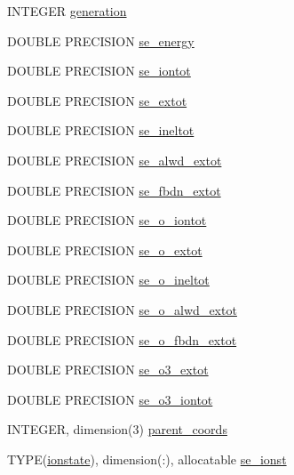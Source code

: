 \begin{DoxyCompactItemize}
\item 
INTEGER \hyperlink{typetypedefs_1_1se__info_aa87601b1b02d6f3982236107d5cdc350}{generation}
\item 
DOUBLE PRECISION \hyperlink{typetypedefs_1_1se__info_a1cb4fd9197cbe6e491f8c015385d3983}{se\_\-energy}
\item 
DOUBLE PRECISION \hyperlink{typetypedefs_1_1se__info_a03b3420231fce0a9fdd58f4579b45700}{se\_\-iontot}
\item 
DOUBLE PRECISION \hyperlink{typetypedefs_1_1se__info_aaeb12f09d4e2ae1f4545c2a9ee1b3b88}{se\_\-extot}
\item 
DOUBLE PRECISION \hyperlink{typetypedefs_1_1se__info_a7be9da23a41fbccf4dc5c0d157ef63e9}{se\_\-ineltot}
\item 
DOUBLE PRECISION \hyperlink{typetypedefs_1_1se__info_a2df8b473f04eca6790c23fcf8721af2d}{se\_\-alwd\_\-extot}
\item 
DOUBLE PRECISION \hyperlink{typetypedefs_1_1se__info_a83ca0f6f1df82c84b483903bf0744388}{se\_\-fbdn\_\-extot}
\item 
DOUBLE PRECISION \hyperlink{typetypedefs_1_1se__info_ab88b1c65d29fd5dd0e82f1fcf0365a34}{se\_\-o\_\-iontot}
\item 
DOUBLE PRECISION \hyperlink{typetypedefs_1_1se__info_a4619ac26e35125680fe8e38428eae0b9}{se\_\-o\_\-extot}
\item 
DOUBLE PRECISION \hyperlink{typetypedefs_1_1se__info_a44003d458c89fc0931faf433b0b6f50c}{se\_\-o\_\-ineltot}
\item 
DOUBLE PRECISION \hyperlink{typetypedefs_1_1se__info_a1aa742b3b6d98a4de72c0232f9c2e2b1}{se\_\-o\_\-alwd\_\-extot}
\item 
DOUBLE PRECISION \hyperlink{typetypedefs_1_1se__info_a85c6182ccd3f9e49ece87ac7ec2d8e97}{se\_\-o\_\-fbdn\_\-extot}
\item 
DOUBLE PRECISION \hyperlink{typetypedefs_1_1se__info_ae366af38541d327018e02f7c121d2fed}{se\_\-o3\_\-extot}
\item 
DOUBLE PRECISION \hyperlink{typetypedefs_1_1se__info_aae367a6217e2ba4848d64c1f37b692d2}{se\_\-o3\_\-iontot}
\item 
INTEGER, dimension(3) \hyperlink{typetypedefs_1_1se__info_a8bd5d9742b432404882c43eeb9378ef5}{parent\_\-coords}
\item 
TYPE(\hyperlink{typetypedefs_1_1ionstate}{ionstate}), dimension(:), allocatable \hyperlink{typetypedefs_1_1se__info_a791773634dc97c66c0792489bc139f4a}{se\_\-ionst}
\item 

\end{DoxyCompactItemize}
